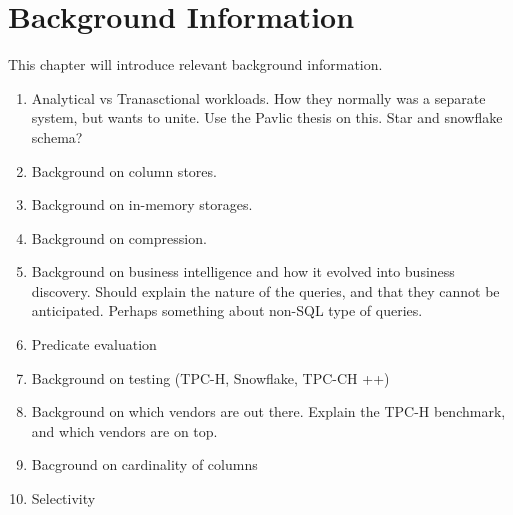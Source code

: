 \chapter{Background Information}
\label{chap:background}
\begin{secex}
This chapter will introduce relevant background information.
\begin{enumerate}
  \item Analytical vs Tranasctional workloads. How they normally was a separate system, but wants to unite. Use the Pavlic thesis on this. Star and snowflake schema?
  \item Background on column stores.
  \item Background on in-memory storages.
  \item Background on compression.
  \item Background on business intelligence and how it evolved into business discovery. Should explain the nature of the queries, and that they cannot be anticipated. Perhaps something about non-SQL type of queries.
  \item Predicate evaluation
  \item Background on testing (TPC-H, Snowflake, TPC-CH ++)
  \item Background on which vendors are out there. Explain the TPC-H benchmark, and which vendors are on top.
  \item Bacground on cardinality of columns
  \item Selectivity
\end{enumerate}
\end{secex}
\clearpage




